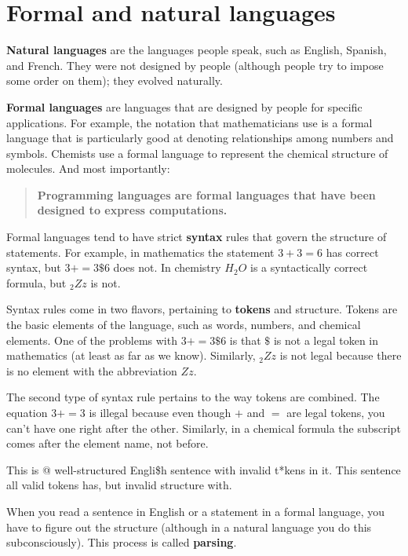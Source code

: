 \section{Formal and natural languages}

{\bf Natural languages} are the languages people speak, such as English,
Spanish, and French. They were not designed by people (although people try to
impose some order on them); they evolved naturally.

{\bf Formal languages} are languages that are designed by people for specific
applications. For example, the notation that mathematicians use is a formal
language that is particularly good at denoting relationships among numbers and
symbols. Chemists use a formal language to represent the chemical structure of
molecules. And most importantly:

\begin{quote}
{\bf Programming languages are formal languages that have been
designed to express computations.}
\end{quote}

Formal languages tend to have strict {\bf syntax} rules that govern the
structure of statements. For example, in mathematics the statement $3 + 3 = 6$
has correct syntax, but $3 + = 3 \$ 6$ does not. In chemistry $H_2O$ is a
syntactically correct formula, but $_2Zz$ is not.

Syntax rules come in two flavors, pertaining to {\bf tokens} and structure.
Tokens are the basic elements of the language, such as words, numbers, and
chemical elements. One of the problems with $3 += 3 \$ 6$ is that \( \$ \) is
not a legal token in mathematics (at least as far as we know). Similarly,
$_2Zz$ is not legal because there is no element with the abbreviation $Zz$.

The second type of syntax rule pertains to the way tokens are
combined. The equation $3 += 3$ is illegal because even though $+$
and $=$ are legal tokens, you can't have one right after the other.
Similarly, in a chemical formula the subscript comes after the element
name, not before.

This is @ well-structured Engli\$h sentence with invalid t*kens in it. This
sentence all valid tokens has, but invalid structure with.

When you read a sentence in English or a statement in a formal language, you
have to figure out the structure (although in a natural language you do this
subconsciously). This process is called {\bf parsing}. 


